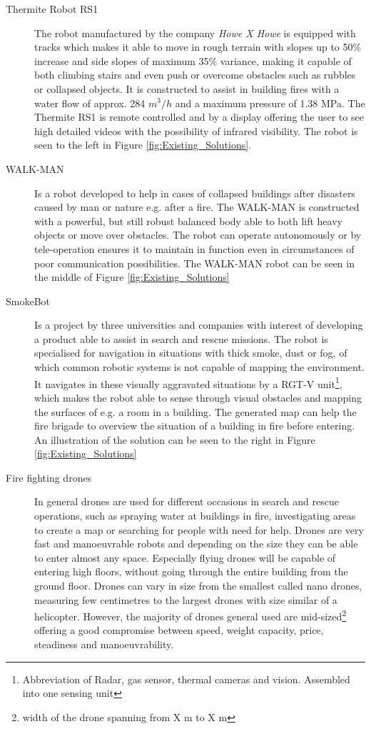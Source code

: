 \begin{description} 
    \item[Thermite Robot RS1] The robot manufactured by the company \textit{Howe X Howe} is equipped with tracks which makes it able to move in rough terrain with slopes up to 50\% increase and side slopes of maximum 35\% variance, making it capable of both climbing stairs and even push or overcome obstacles such as rubbles or collapsed objects. It is constructed to assist in building fires with a water flow of approx. 284 $m^3/h$ and a maximum pressure of 1.38 MPa. The Thermite RS1 is remote controlled and by a display offering the user to see high detailed videos with the possibility of infrared visibility. The robot is seen to the left in Figure \ref{fig:Existing_Solutions}. \cite{SearchAndRescue:Thermite_RS1}
    \item[WALK-MAN] Is a robot developed to help in cases of collapsed buildings after disasters caused by man or nature e.g. after a fire. The WALK-MAN is constructed with a powerful, but still robust balanced body able to both lift heavy objects or move over obstacles. The robot can operate autonomously or by tele-operation ensures it to maintain in function even in circumstances of poor communication possibilities. The WALK-MAN robot can be seen in the middle of Figure \ref{fig:Existing_Solutions} \cite{SearchAndRescue:WALK-MAN}
    \item[SmokeBot] Is a project by three universities and companies with interest of developing a product able to assist in search and rescue missions. The robot is specialised for navigation in situations with thick smoke, dust or fog, of which common robotic systems is not capable of mapping the environment. It navigates in these visually aggravated situations by a RGT-V unit\footnote{Abbreviation of Radar, gas sensor, thermal cameras and vision. Assembled into one sensing unit}, which makes the robot able to sense through visual obstacles and mapping the surfaces of e.g. a room in a building. The generated map can help the fire brigade to overview the situation of a building in fire before entering. An illustration of the solution can be seen to the right in Figure \ref{fig:Existing_Solutions} \cite{SearchAndRescue:SmokeBot}
    \item[Fire fighting drones] In general drones are used for different occasions in search and rescue operations, such as spraying water at buildings in fire, investigating areas to create a map or searching for people with need for help. Drones are very fast and manoeuvrable robots and depending on the size they can be able to enter almost any space. Especially flying drones will be capable of entering high floors, without going through the entire building from the ground floor. Drones can vary in size from the smallest called nano drones, measuring few centimetres to the largest drones with size similar of a helicopter. However, the majority of drones general used are mid-sized\footnote{width of the drone spanning from X m to X m} offering a good compromise between speed, weight capacity, price, steadiness and manoeuvrability. \cite{SearchAndRescue:Drone_size}
\end{description}

